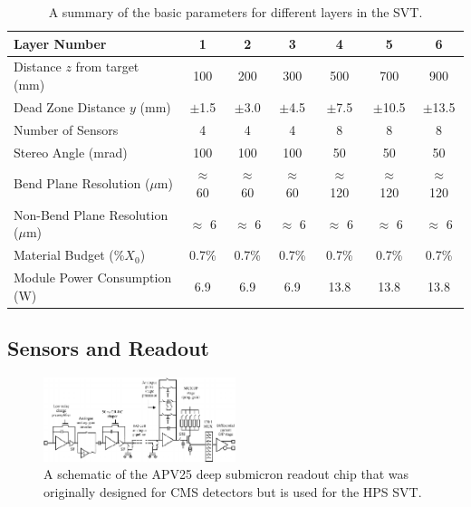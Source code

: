 \begin{table}[!hb] 
    \centering
    \begin{tabular}{lcccccc}
        \toprule
        \textbf{Layer Number} & \textbf{1} & \textbf{2} & \textbf{3} & \textbf{4} & \textbf{5} & \textbf{6} \\
        \midrule
        \midrule
            Distance $z$ from target (mm) & 100 & 200 & 300 & 500 & 700 & 900 \\
            Dead Zone Distance $y$ (mm) & $\pm$1.5 & $\pm$3.0 & $\pm$4.5 & $\pm$7.5 & $\pm$10.5 & $\pm$13.5 \\
            Number of Sensors & 4 & 4 & 4 & 8 & 8 & 8 \\
            Stereo Angle (mrad) & 100 & 100 & 100 & 50 & 50 & 50 \\
            Bend Plane Resolution ($\mu$m) & $\approx$ 60 & $\approx$ 60 & $\approx$ 60 & $\approx$ 120 & $\approx$ 120 & $\approx$ 120 \\
            Non-Bend Plane Resolution ($\mu$m) & $\approx$ 6 & $\approx$ 6 & $\approx$ 6 & $\approx$ 6 & $\approx$ 6 & $\approx$ 6 \\
            Material Budget (\%$X_0$) & 0.7\% & 0.7\% & 0.7\% & 0.7\% & 0.7\% & 0.7\% \\
            Module Power Consumption (W) & 6.9 & 6.9 & 6.9 & 13.8 & 13.8 & 13.8 \\
        \bottomrule
    \end{tabular}
    \caption{A summary of the basic parameters for different layers in the SVT.}
    \label{tab:svt}
\end{table}

\clearpage

\subsection{Sensors and Readout}\label{sec:sensors}

\begin{figure}
    \centering
    \includegraphics[width=0.5\textwidth]{figs/detector/apv25.png}
    \caption{A schematic of the APV25 deep submicron readout chip that was originally designed for CMS detectors but is used for the HPS SVT.}
    \label{fig:apv25}
\end{figure}

